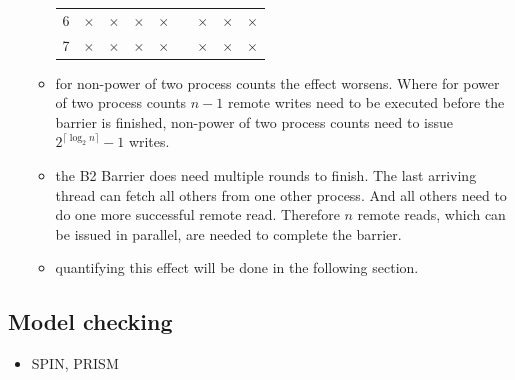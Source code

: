\documentclass[a4paper, 10pt]{article}
\begin{document}
\begin{itemize}
\begin{itemize}
\begin{table}[htbp]
\begin{minipage}{0.42\linewidth}
{\begin{tabular}{c | c c c c c c c c}
								6 & $\times$ & $\times$ & $\times$ & $\times$ &   & $\times$ & $\times$ & $\times$ \\
								7 & $\times$ & $\times$ & $\times$ & $\times$ &   & $\times$ & $\times$ & $\times$ \\
							\end{tabular}
						}
					\end{minipage}
					\label{tab:table-dissemination-progress}
				\end{table}
			\item for non-power of two process counts the effect worsens. Where for power of two process counts $n-1$ remote writes need to be executed before the barrier is finished, non-power of two process counts need to issue $2^{\lceil \log_2 n \rceil} - 1$ writes.
			\item the B2 Barrier does need multiple rounds to finish. The last arriving thread can fetch all others from one other process. And all others need to do one more successful remote read. Therefore $n$ remote reads, which can be issued in parallel, are needed to complete the barrier.
			\item quantifying this effect will be done in the following section.
		\end{itemize}
\end{itemize}

\subsection{Model checking}
\label{ssec:analysis-modelchecking}
\begin{itemize}
	\item SPIN\cite{spin, hol97}, PRISM\cite{prism, knp09}
\end{itemize}

\end{document}
